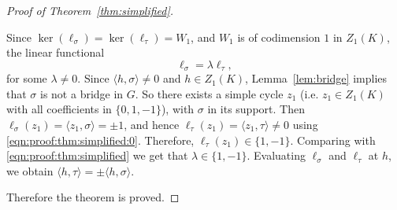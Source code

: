 \documentclass[10pt,a4paper]{amsart}
\newcommand {\la}   {{\langle}}
\newcommand {\ra}   {{\rangle}}
\begin{document}
\begin{proof}[Proof of Theorem~\ref{thm:simplified}]
\begin{enumerate}
Since $\operatorname{ker}(\ell_\sigma) = \operatorname{ker}(\ell_\tau) = W_1$,
and $W_1$ is of codimension $1$ in $Z_1(K)$, the linear functional 
\begin{equation}
\label{eqn:proof:thm:simplified}
\ell_\sigma = \lambda \ell_\tau,
\end{equation}
for some $\lambda \neq 0$. 
Since $\la h, \sigma \ra \neq 0$ and $h \in Z_1(K)$, Lemma~\ref{lem:bridge} implies that $\sigma$ is not a bridge in $G$. So there exists a simple cycle $z_1$
(i.e.
$z_1 \in Z_1(K)$ with all coefficients in $\{0,1,-1\}$), with $\sigma$ in its support. Then 
$\ell_\sigma(z_1) = \la z_1,\sigma\ra = \pm 1$, and hence $\ell_\tau(z_1) = \la z_1,\tau\ra  \neq 0$ using \eqref{eqn:proof:thm:simplified:0}. Therefore,
$\ell_\tau(z_1) \in \{1,-1\}$. 
Comparing with \eqref{eqn:proof:thm:simplified} we get that $\lambda \in \{1,-1\}$.
Evaluating $\ell_\sigma$ and $\ell_\tau$ at $h$, we obtain
$\la h, \tau\ra = \pm \la h, \sigma\ra$.
\end{enumerate}
Therefore the theorem is proved.
\end{proof}
\end{document}
